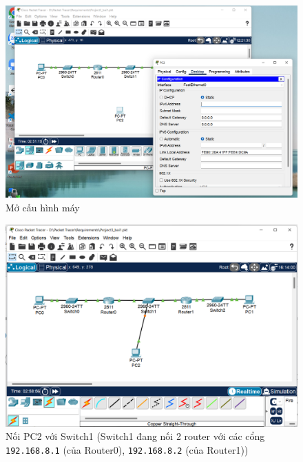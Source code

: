 \begin{enumerate}
\begin{figure}[H]
\begin{center}
\includegraphics[scale=0.4]{../figures/p1/p1-5c}
\end{center}
\caption{Mở cấu hình máy}
\end{figure}

\begin{figure}[H]
\begin{center}
\includegraphics[scale=0.4]{../figures/p1/p1-5d}
\end{center}
\caption{Nối PC2 với Switch1 (Switch1 đang nối 2 router với các cổng \texttt{192.168.8.1} (của Router0), \texttt{192.168.8.2} (của Router1))}
\end{figure}


\end{enumerate}
